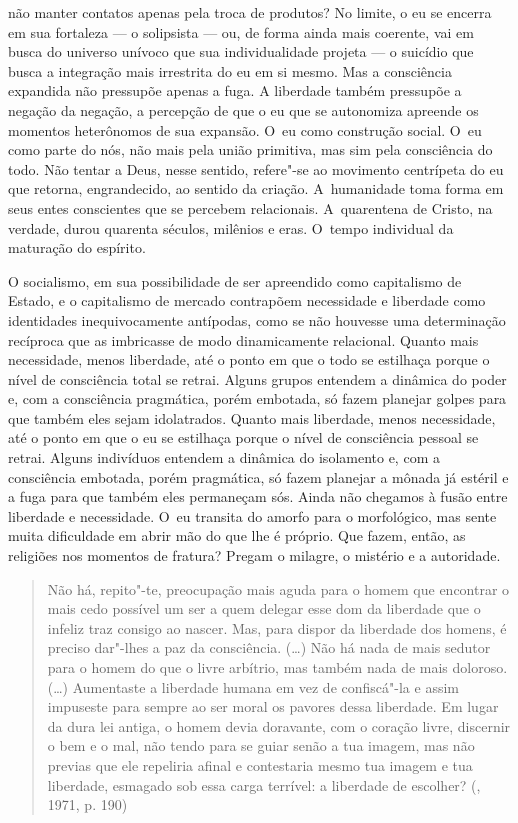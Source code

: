 não manter contatos apenas pela troca de produtos? No limite, o eu se
encerra em sua fortaleza --- o solipsista --- ou, de forma ainda mais
coerente, vai em busca do universo unívoco que sua individualidade
projeta --- o suicídio que busca a integração mais irrestrita do eu em si
mesmo. Mas a consciência expandida não pressupõe apenas a fuga. A
liberdade também pressupõe a negação da negação, a percepção de que o eu
que se autonomiza apreende os momentos heterônomos de sua expansão. O~eu
como construção social. O~eu como parte do nós, não mais pela união
primitiva, mas sim pela consciência do todo. Não tentar a Deus, nesse
sentido, refere"-se ao movimento centrípeta do eu que retorna,
engrandecido, ao sentido da criação. A~humanidade toma forma em seus
entes conscientes que se percebem relacionais. A~quarentena de Cristo,
na verdade, durou quarenta séculos, milênios e eras. O~tempo individual
da maturação do espírito.

O socialismo, em sua possibilidade de ser apreendido como capitalismo de
Estado, e o capitalismo de mercado contrapõem necessidade e liberdade
como identidades inequivocamente antípodas, como se não houvesse uma
determinação recíproca que as imbricasse de modo dinamicamente
relacional. Quanto mais necessidade, menos liberdade, até o ponto em que
o todo se estilhaça porque o nível de consciência total se retrai.
Alguns grupos entendem a dinâmica do poder e, com a consciência
pragmática, porém embotada, só fazem planejar golpes para que também
eles sejam idolatrados. Quanto mais liberdade, menos necessidade, até o
ponto em que o eu se estilhaça porque o nível de consciência pessoal se
retrai. Alguns indivíduos entendem a dinâmica do isolamento e, com a
consciência embotada, porém pragmática, só fazem planejar a mônada já
estéril e a fuga para que também eles permaneçam sós. Ainda não chegamos
à fusão entre liberdade e necessidade. O~eu transita do amorfo para o
morfológico, mas sente muita dificuldade em abrir mão do que lhe é
próprio. Que fazem, então, as religiões nos momentos de fratura? Pregam
o milagre, o mistério e a autoridade.

\begin{quote}
Não há, repito"-te, preocupação mais aguda para o homem que encontrar o
mais cedo possível um ser a quem delegar esse dom da liberdade que o
infeliz traz consigo ao nascer. Mas, para dispor da liberdade dos
homens, é preciso dar"-lhes a paz da consciência. (\ldots) Não há nada de
mais sedutor para o homem do que o livre arbítrio, mas também nada de
mais doloroso. (\ldots) Aumentaste a liberdade humana em vez de confiscá"-la
e assim impuseste para sempre ao ser moral os pavores dessa liberdade.
Em lugar da dura lei antiga, o homem devia doravante, com o coração
livre, discernir o bem e o mal, não tendo para se guiar senão a tua
imagem, mas não previas que ele repeliria afinal e contestaria mesmo tua
imagem e tua liberdade, esmagado sob essa carga terrível: a liberdade de
escolher? (, 1971, p. 190)
\end{quote}

